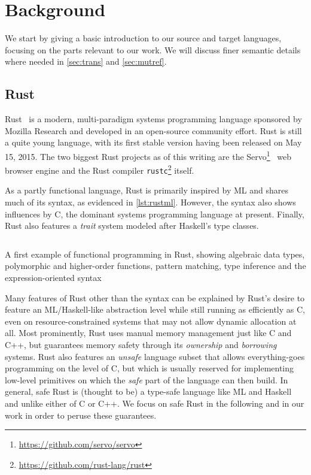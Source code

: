 \section{Background}

We start by giving a basic introduction to our source and target
languages, focusing on the parts relevant to our work. We will discuss finer
semantic details where needed in \autoref{sec:trans} and \autoref{sec:mutref}.

\subsection{Rust}
\label{sec:rust}

Rust~\cite{matsakis2014rust} is a modern, multi-paradigm systems programming language sponsored
by Mozilla Research and developed in an open-source community effort. Rust is still a quite young language, with its first stable
version having been released on May 15, 2015. The two biggest Rust projects as of
this writing are the Servo\footnote{\url{https://github.com/servo/servo}}~\cite{anderson2016engineering} web browser engine and
the Rust compiler \texttt{rustc}\footnote{\url{https://github.com/rust-lang/rust}} itself.

As a partly functional language, Rust is primarily inspired by ML and shares much of
its syntax, as evidenced in \autoref{lst:rustml}. However, the syntax also shows
influences by C, the dominant systems programming language at present.
Finally, Rust also features a \emph{trait} system modeled after Haskell's type classes.

\begin{listing}[!bp]
  \inputminted{rust}{code/rustml.rs}
  
  \caption{A first example of functional programming in Rust, showing algebraic
    data types, polymorphic and higher-order functions, pattern matching, type
    inference and the expression-oriented syntax}
  \label{lst:rustml}
\end{listing}

Many features of Rust other than the syntax can be explained by Rust's desire to
feature an ML/Haskell-like abstraction level while still running as efficiently as C,
even on resource-constrained systems that may not allow dynamic allocation at all.
Most prominently, Rust uses manual memory management just like C and C++, but
guarantees memory safety through its \emph{ownership} and
\emph{borrowing} systems. Rust also features an \emph{unsafe} language subset that allows
everything-goes programming on the level of C, but which is usually reserved for
implementing low-level primitives on which the \emph{safe} part of the language can
then build. In general, safe Rust is (thought to be) a type-safe
language like ML and Haskell and unlike either of C or C++. We focus on safe Rust in the
following and in our work in order to peruse these guarantees.

